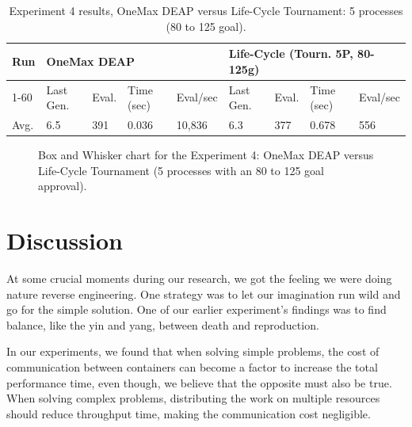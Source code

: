 \documentclass[graybox]{svmult}
\begin{document}
\begin{table}[]
    \centering        
    \caption{Experiment 4 results, OneMax DEAP versus Life-Cycle Tournament: 5 processes (80 to 125 goal).}\label{tab.experiment4}
    \begin{tabular}{|l|l|l|l|l|l|l|l|l|}
    \hline
    Run & \multicolumn{4}{l|}{OneMax DEAP} & \multicolumn{4}{l|}{Life-Cycle (Tourn. 5P, 80-125g)} \\ \hline
    1-60 & Last Gen. & Eval. & Time (sec) & Eval/sec & Last Gen. & Eval. & Time (sec) & Eval/sec \\ \hline
    Avg. & 6.5 & 391 & 0.036 & 10,836 & 6.3 & 377 & 0.678 & 556 \\ \hline
    \end{tabular}
    \end{table}

\begin{figure}
    \caption{Box and Whisker chart for the Experiment 4: OneMax DEAP versus Life-Cycle Tournament (5 processes with an 80 to 125 goal approval).} \label{fig.experiment4}
    \end{figure}


\section{Discussion}
\label{section.discussion}

At some crucial moments during our research, we got the feeling we were doing
nature reverse engineering. One strategy was to let our imagination run wild
and go for the simple solution. One of our earlier experiment's findings was to
find balance, like the yin and yang, between death and reproduction.

In our experiments, we found that when solving simple problems, the cost of
communication between containers can become a factor to increase the total
performance time, even though, we believe that the opposite must also be true.
When solving complex problems, distributing the work on multiple resources
should reduce throughput time, making the communication cost negligible.
\end{document}
